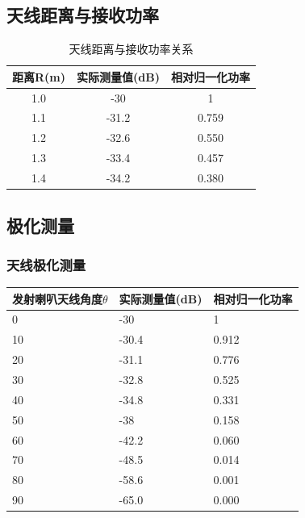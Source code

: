 \documentclass{../source/zjureport}
\begin{document}
    \subsection{天线距离与接收功率}
    \begin{table}[H]
        \centering
        \begin{tabular}{|c|c|c|}
        \hline
            距离R(m) & 实际测量值(dB) & 相对归一化功率 \\ \hline
            1.0 & -30 & 1 \\ \hline
            1.1 & -31.2 & 0.759 \\ \hline
            1.2 & -32.6 & 0.550 \\ \hline
            1.3 & -33.4 & 0.457 \\ \hline
            1.4 & -34.2 & 0.380 \\ \hline
        \end{tabular}
        \caption{天线距离与接收功率关系}
    \end{table}

    
    

        \subsection{极化测量}
        \subsubsection{天线极化测量}
        \begin{table}[H]
            \centering
            \begin{tabular}{|l|l|l|}
            \hline
                发射喇叭天线角度$\theta$ & 实际测量值(dB) & 相对归一化功率 \\ \hline
                0 & -30 & 1 \\ \hline
                10 & -30.4 & 0.912 \\ \hline
                20 & -31.1 & 0.776 \\ \hline
                30 & -32.8 & 0.525 \\ \hline
                40 & -34.8 & 0.331 \\ \hline
                50 &  -38  & 0.158 \\ \hline
                60 & -42.2 & 0.060 \\ \hline
                70 & -48.5 & 0.014 \\ \hline
                80 & -58.6 & 0.001 \\ \hline
                90 & -65.0 & 0.000 \\ \hline
            \end{tabular}
        \end{table}
\end{document}
